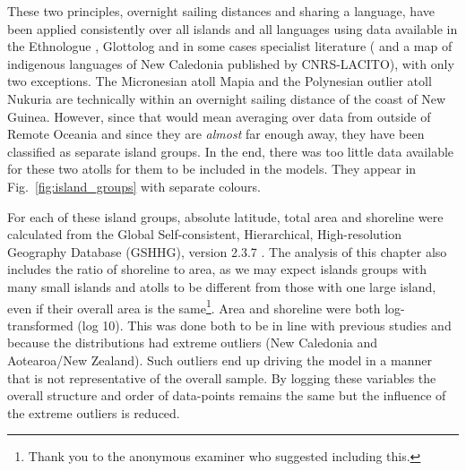 \documentclass[a4paper,10pt]{article} %
\begin{document}
These two principles, overnight sailing distances and sharing a language, have been applied consistently over all islands and all languages using data available in the Ethnologue \citep{ethnologue22}, Glottolog \citep{glottolog40} and in some cases specialist literature (\citet{faaniu1983tuvalu,charpentier2012linguistic, francoisetatl2015, macdonald_2020, omniglot_tuvaluan} and a map of indigenous languages of New Caledonia published by CNRS-LACITO), with only two exceptions. The Micronesian atoll Mapia and the Polynesian outlier atoll Nukuria are technically within an overnight sailing distance of the coast of New Guinea. However, since that would mean averaging over data from outside of Remote Oceania and since they are \emph{almost} far enough away, they have been classified as separate island groups. In the end, there was too little data available for these two atolls for them to be included in the models. They appear in Fig.~\ref{fig:island_groups} with separate colours.

For each of these island groups, absolute latitude, total area and shoreline were calculated from the Global Self-consistent, Hierarchical, High-resolution Geography Database (GSHHG), version 2.3.7 \citep{wessel1996global}. The analysis of this chapter also includes the ratio of shoreline to area, as we may expect islands groups with many small islands and atolls to be different from those with one large island, even if their overall area is the same\footnote{Thank you to the anonymous examiner who suggested including this.}. Area and shoreline were both log-transformed (log 10). This was done both to be in line with previous studies \citep{gavin2012island} and because the distributions had extreme outliers (New Caledonia and Aotearoa/New Zealand). Such outliers end up driving the model in a manner that is not representative of the overall sample. By logging these variables the overall structure and order of data-points remains the same but the influence of the extreme outliers is reduced.

\end{document}
